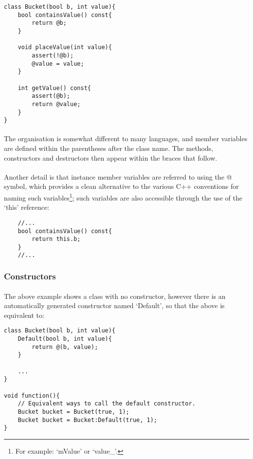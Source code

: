 \documentclass[12pt,twoside,notitlepage]{report}
\begin{document}
\begin{lstlisting}
class Bucket(bool b, int value){
	bool containsValue() const{
		return @b;
	}
	
	void placeValue(int value){
		assert(!@b);
		@value = value;
	}
	
	int getValue() const{
		assert(@b);
		return @value;
	}
}
\end{lstlisting}


\paragraph{}
The organisation is somewhat different to many languages, and member variables are defined within the parentheses after the class name. The methods, constructors and destructors then appear within the braces that follow.

\paragraph{}
Another detail is that instance member variables are referred to using the @ symbol, which provides a clean alternative to the various C++ conventions for naming such variables\footnote{For example: `mValue' or `value\_'.}; such variables are also accessible through the use of the `this' reference:


\begin{lstlisting}
	//...
	bool containsValue() const{
		return this.b;
	}
	//...
\end{lstlisting}


\subsubsection{Constructors}

\paragraph{}
The above example shows a class with no constructor, however there is an automatically generated constructor named `Default', so that the above is equivalent to:


\begin{lstlisting}
class Bucket(bool b, int value){
	Default(bool b, int value){
		return @(b, value);
	}

	...
}

void function(){
	// Equivalent ways to call the default constructor.
	Bucket bucket = Bucket(true, 1);
	Bucket bucket = Bucket:Default(true, 1);
}
\end{lstlisting}
\end{document}
